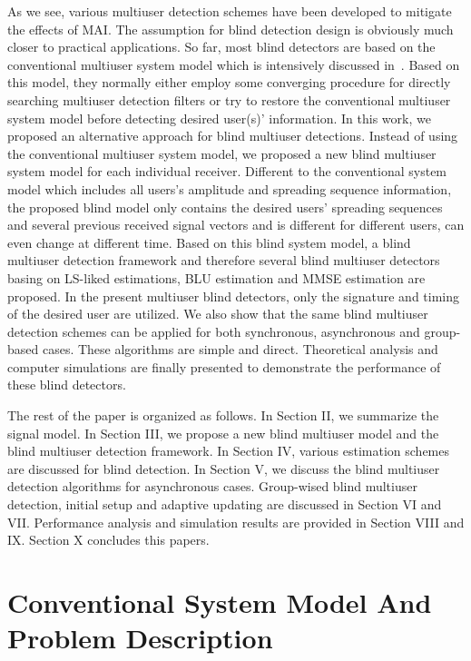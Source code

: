 \documentclass[a4paper,11pt,fleqn]{article}
\begin{document}
As we see, various multiuser detection schemes have been developed
to mitigate the effects of MAI. The assumption for blind detection
design is obviously much closer to practical applications. So far,
most blind detectors are based on the conventional multiuser
system model which is intensively discussed in~\cite{Verd98}.
Based on this model, they normally either employ some converging
procedure for directly searching multiuser detection filters or
try to restore the conventional multiuser system model before
detecting desired user(s)' information. In this work, we proposed
an alternative approach for blind multiuser detections. Instead of
using the conventional multiuser system model, we proposed a new
blind multiuser system model for each individual receiver.
Different to the conventional system model which includes all
users's amplitude and spreading sequence information, the proposed
blind model only contains the desired users' spreading sequences
and several previous received signal vectors and is different for
different users, can even change at different time. Based on this
blind system model, a blind multiuser detection framework and
therefore several blind multiuser detectors basing on LS-liked
estimations, BLU estimation and MMSE estimation are proposed. In
the present multiuser blind detectors, only the signature and
timing of the desired user are utilized. We also show that the
same blind multiuser detection schemes can be applied for both
synchronous, asynchronous and group-based cases. These algorithms
are simple and direct. Theoretical analysis and computer
simulations are finally presented to demonstrate the performance
of these blind detectors.

The rest of the paper is organized as follows. In Section II, we
summarize the signal model. In Section III, we propose a new blind
multiuser model and the blind multiuser detection framework. In
Section IV, various estimation schemes are discussed for blind
detection. In Section V, we discuss the blind multiuser detection
algorithms for asynchronous cases. Group-wised blind multiuser
detection, initial setup and adaptive updating are discussed in
Section VI and VII. Performance analysis and simulation results
are provided in Section VIII and IX. Section X concludes this
papers.

\pagebreak

\section{Conventional System Model And Problem Description}
\end{document}
